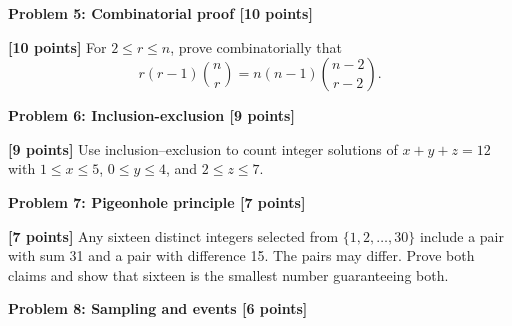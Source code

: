 \documentclass[12pt,letterpaper]{article}
\newcommand{\problemheading}[2][5\baselineskip]{\Needspace{#1}\par\noindent\hspace*{-0.625in}\textbf{#2}\par\nobreak\vspace{0.3em}}
\newcommand{\examspace}[1]{\par\vspace*{#1cm}}
\begin{document}
\clearpage
\vspace*{0.21in}
\problemheading{Problem 5: Combinatorial proof [10 points]}
\begin{list}{}{\setlength{\leftmargin}{0.25in}\setlength{\rightmargin}{0.25in}}\item[]
\begin{description}[font=\normalfont,leftmargin=1.2em,labelsep=0.4em]
\item[] \textbf{[10 points]} For $2\le r\le n$, prove combinatorially that\[r(r-1)\binom nr=n(n-1)\binom{n-2}{r-2}.\]
\examspace{7}
\end{description}
\end{list}
\clearpage
\vspace*{0.21in}
\problemheading{Problem 6: Inclusion-exclusion [9 points]}
\begin{list}{}{\setlength{\leftmargin}{0.25in}\setlength{\rightmargin}{0.25in}}\item[]
\begin{description}[font=\normalfont,leftmargin=1.2em,labelsep=0.4em]
\item[] \textbf{[9 points]} Use inclusion--exclusion to count integer solutions of $x+y+z=12$ with $1\le x\le5$, $0\le y\le4$, and $2\le z\le7$.
\examspace{7}
\end{description}
\end{list}
\clearpage
\vspace*{0.21in}
\problemheading{Problem 7: Pigeonhole principle [7 points]}
\begin{list}{}{\setlength{\leftmargin}{0.25in}\setlength{\rightmargin}{0.25in}}\item[]
\begin{description}[font=\normalfont,leftmargin=1.2em,labelsep=0.4em]
\item[] \textbf{[7 points]} Any sixteen distinct integers selected from $\{1,2,\ldots,30\}$ include a pair with sum 31 and a pair with difference 15. The pairs may differ. Prove both claims and show that sixteen is the smallest number guaranteeing both.
\examspace{7}
\end{description}
\end{list}
\clearpage
\vspace*{0.21in}
\problemheading{Problem 8: Sampling and events [6 points]}
\end{document}
